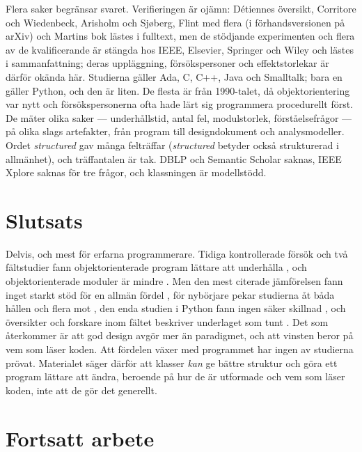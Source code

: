 Flera saker begränsar svaret.  Verifieringen är ojämn: Détiennes
översikt, Corritore och Wiedenbeck, Arisholm och Sjøberg, Flint med
flera (i förhandsversionen på arXiv) och Martins bok lästes i fulltext, men de stödjande experimenten och flera av de
kvalificerande är stängda hos IEEE, Elsevier, Springer och Wiley och
lästes i sammanfattning; deras uppläggning, försökspersoner och
effektstorlekar är därför okända här.  Studierna gäller Ada, C, C++,
Java och Smalltalk; bara en gäller Python, och den är liten.  De flesta är från 1990-talet, då
objektorientering var nytt och försökspersonerna ofta hade lärt sig
programmera procedurellt först.  De mäter olika saker ---
underhållstid, antal fel, modulstorlek, förståelsefrågor ---
på olika slags artefakter, från program till designdokument och
analysmodeller.  Ordet \emph{structured} gav många felträffar
(\emph{structured} betyder också strukturerad i allmänhet), och
träffantalen är tak.  DBLP och Semantic Scholar saknas, IEEE Xplore
saknas för tre frågor, och klassningen är modellstödd.

\section{Slutsats}
\label{sec:und-slutsats}

Delvis, och mest för erfarna programmerare.  Tidiga kontrollerade försök
och två fältstudier fann objektorienterade program lättare att underhålla
\autocite{HenryHumphrey1990,HenryHumphreyLewis1990,LowHuan1999,Lim2005}, och
objektorienterade moduler är mindre \autocite{FerrettOffutt2002}.  Men
den mest citerade jämförelsen fann inget starkt stöd för en allmän
fördel \autocite{Briand1997Maintainability}, för nybörjare pekar
studierna åt båda hållen och flera mot
\autocite{RamalingamWiedenbeck1997,WiedenbeckRamalingam1999,Wiedenbeck1999,ArisholmSjoberg2004,AlardawiAgil2015},
den enda studien i Python fann ingen säker skillnad
\autocite{Flint2026Python},
och översikter och forskare inom fältet beskriver underlaget som tunt
\autocite{Detienne1997,CorritoreWiedenbeck2001,EiermanDishaw2007}.
Det som återkommer är att god design avgör mer än paradigmet, och att
vinsten beror på vem som läser koden.  Att fördelen växer med programmet
har ingen av studierna prövat.  Materialet säger därför att klasser
\emph{kan} ge bättre struktur och göra ett program lättare att ändra,
beroende på hur de är utformade och vem som läser koden, inte att de gör
det generellt.

\section{Fortsatt arbete}
\label{sec:und-fortsatt}

